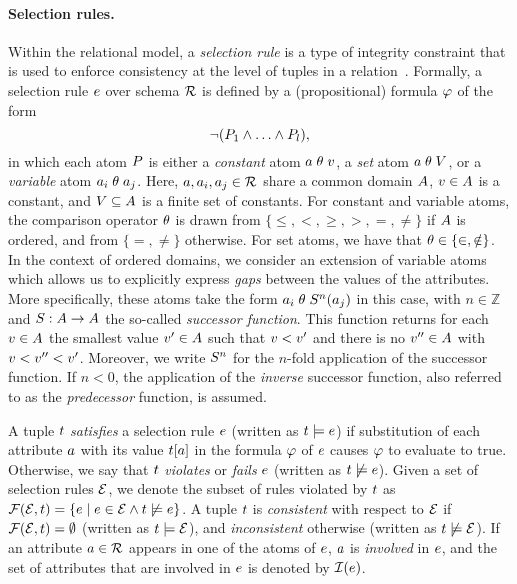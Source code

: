 \paragraph{Selection rules.}
Within the relational model, a \emph{selection rule} is a type of integrity constraint that is used to enforce consistency at the level of tuples in a relation~\cite{Boeckling2022b,Boeckling2022a,Bronselaer2023}.
Formally, a selection rule $e$ over schema $\mathcal{R}$ is defined by a (propositional) formula $\varphi$ of the form
\begin{equation}
    \label{eq:sruleform}
    \neg (P_{1} \wedge \ldots \wedge P_{l}),
\end{equation}
in which each atom $P$ is either a \emph{constant} atom $a\;\theta\;v$, a \emph{set} atom $a\;\theta\;V$, or a \emph{variable} atom $a_{i}\;\theta\;a_{j}$.
Here, $a, a_{i}, a_{j} \in \mathcal{R}$ share a common domain $A$, $v \in A$ is a constant, and $V \subseteq A$ is a finite set of constants.
For constant and variable atoms, the comparison operator $\theta$ is drawn from $\{\leq, <, \geq, >, =, \neq\}$ if $A$ is ordered, and from $\{=, \neq\}$ otherwise.
For set atoms, we have that $\theta \in \{\in, \notin\}$.
In the context of ordered domains, we consider an extension of variable atoms which allows us to explicitly express \emph{gaps} between the values of the attributes.
More specifically, these atoms take the form $a_{i}\;\theta\; S^{n}(a_{j})$ in this case, with $n \in \mathbb{Z}$ and $S: A \rightarrow A$ the so-called \emph{successor function}.
This function returns for each $v \in A$ the smallest value $v' \in A$ such that $v < v'$ and there is no $v'' \in A$ with $v < v'' < v'$.
Moreover, we write $S^{n}$ for the $n$-fold application of the successor function.
If $n < 0$, the application of the \emph{inverse} successor function, also referred to as the \emph{predecessor} function, is assumed.

A tuple $t$ \emph{satisfies} a selection rule $e$ (written as $t \models e$) if substitution of each attribute $a$ with its value $t[a]$ in the formula $\varphi$ of $e$ causes $\varphi$ to evaluate to true.
Otherwise, we say that $t$ \emph{violates} or \emph{fails} $e$ (written as $t \not\models e$).
Given a set of selection rules $\mathcal{E}$, we denote the subset of rules violated by $t$ as $\mathcal{F}(\mathcal{E}, t) = \{e \mid e \in \mathcal{E} \wedge t \not\models e\}$.
A tuple $t$ is \emph{consistent} with respect to $\mathcal{E}$ if $\mathcal{F}(\mathcal{E}, t) = \emptyset$ (written as $t \models \mathcal{E}$), and \emph{inconsistent} otherwise (written as $t \not\models \mathcal{E}$).
If an attribute $a \in \mathcal{R}$ appears in one of the atoms of  $e$, $a$ is \emph{involved} in $e$, and the set of attributes that are involved in $e$ is denoted by $\mathcal{I}(e)$.

